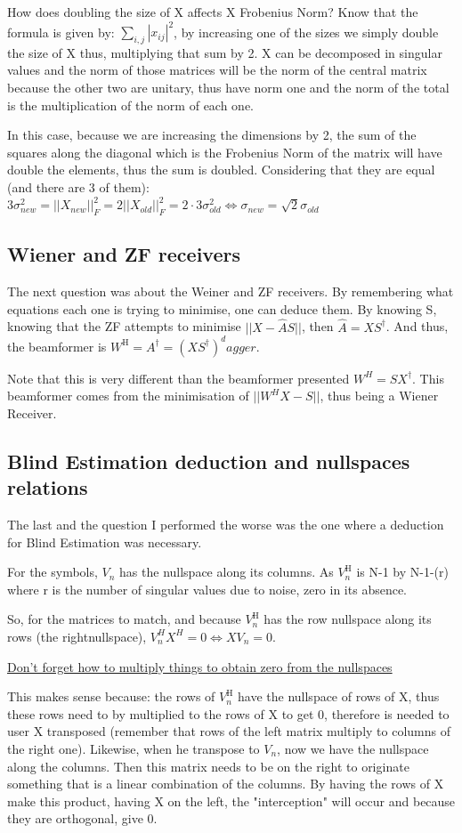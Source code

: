 \documentclass[12pt, a4paper]{article}
\begin{document}
How does doubling the size of X affects X Frobenius Norm? Know that the formula is given by: $\sum_{i,j} |x_{ij}|^2$, by increasing one of the sizes we simply double the size of X thus, multiplying that sum by 2. X can be decomposed in singular values and the norm of those matrices will be the norm of the central matrix because the other two are unitary, thus have norm one and the norm of the total is the multiplication of the norm of each one.

In this case, because we are increasing the dimensions by 2, the sum of the squares along the diagonal which is the Frobenius Norm of the matrix will have double the elements, thus the sum is doubled. Considering that they are equal (and there are 3 of them): \\
$3 \sigma_{new}^2 = ||X_{new}||_F^2 = 2 ||X_{old}||_F^2 = 2 \cdot 3 \sigma_{old}^2 \Leftrightarrow \sigma_{new} = \sqrt{2} \sigma_{old}$


\subsection{Wiener and ZF receivers}

The next question was about the Weiner and ZF receivers. By remembering what equations each one is trying to minimise, one can deduce them. By knowing S, knowing that the ZF attempts to minimise $||X - \hat{A}S||$, then $\hat{A} = X S^\dagger$. And thus, the beamformer is $W^\text{H} = A^\dagger = (XS^\dagger)^dagger$.

Note that this is very different than the beamformer presented $W^H = S X^\dagger$. This beamformer comes from the minimisation of $||W^HX - S||$, thus being a Wiener Receiver. 

\subsection{Blind Estimation deduction and nullspaces relations}

The last and the question I performed the worse was the one where a deduction for Blind Estimation was necessary.

For the symbols, $V_n$ has the nullspace along its columns. As $V_n^\text{H}$ is N-1 by N-1-(r)  where r is the number of singular values due to noise, zero in its absence.

So, for the matrices to match, and because $V_n^\text{H}$ has the row nullspace along its rows (the rightnullspace), $V_n^H X^H = 0 \Leftrightarrow X V_n = 0$.

\uline{Don't forget how to multiply things to obtain zero from the nullspaces}

This makes sense because: the rows of $V_n^\text{H}$ have the nullspace of rows of X, thus these rows need to by multiplied to the rows of X to get 0, therefore is needed to user X transposed (remember that rows of the left matrix multiply to columns of the right one). Likewise, when he transpose to $V_n$, now we have the nullspace along the columns. Then this matrix needs to be on the right to originate something that is a linear combination of the columns. By having the rows of X make this product, having X on the left, the "interception" will occur and because they are orthogonal, give 0.
\end{document}
